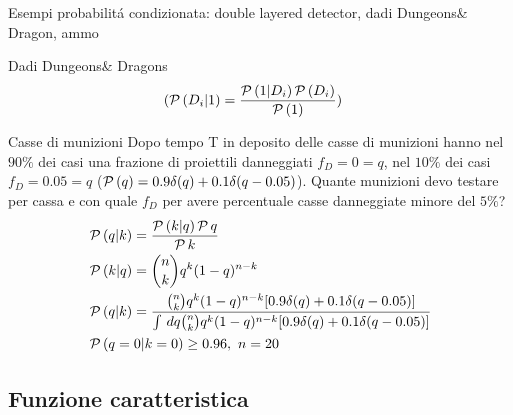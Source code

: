 \begin{frame}[allowframebreaks]{Esempi probabilit\'a condizionata: double layered detector, dadi Dungeons\& Dragon, ammo}
\begin{block}{Dadi Dungeons\& Dragons}
\begin{align*}
	&(\operatorname{\mathcal{P}}{(D_i|1)}=\frac{\operatorname{\mathcal{P}}{(1|D_i)}\operatorname{\mathcal{P}}{(D_i)}}{\operatorname{\mathcal{P}}{(1)}})
	\end{align*}
\end{block}
\begin{block}{Casse di munizioni}
	Dopo tempo T in deposito delle casse di munizioni hanno nel $90\%$ dei casi una frazione di proiettili danneggiati $f_D=0=q$, nel $10\%$ dei casi $f_D=0.05=q$ ($\operatorname{\mathcal{P}}{(q)}=0.9\delta(q)+0.1\delta(q-0.05)$). Quante munizioni devo testare per cassa e con quale $f_D$ per avere percentuale casse danneggiate minore del $5\%$?
	\begin{align*}
	&\operatorname{\mathcal{P}}{(q|k)}=\frac{\operatorname{\mathcal{P}}{(k|q)}\operatorname{\mathcal{P}}{q}}{\operatorname{\mathcal{P}}{k}}\\
	&\operatorname{\mathcal{P}}{(k|q)}=\binom{n}{k}q^k(1-q)^{n-k}\\
	&\operatorname{\mathcal{P}}{(q|k)}=\frac{\binom{n}{k}q^k(1-q)^{n-k}[0.9\delta(q)+0.1\delta(q-0.05)]}{\int\,dq\binom{n}{k}q^k(1-q)^{n-k}[0.9\delta(q)+0.1\delta(q-0.05)]}\\
	&\operatorname{\mathcal{P}}{(q=0|k=0)}\geq0.96,\ n=20
	\end{align*}
\end{block}
\end{frame}

\subsection{Funzione caratteristica}

